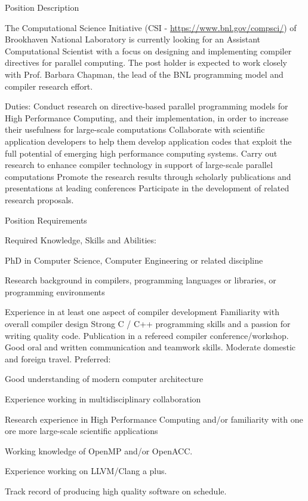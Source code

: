 \begin{frame}[label=jobApp]
{Position Description
 
The Computational Science Initiative (CSI -
\url{https://www.bnl.gov/compsci/}) of Brookhaven National Laboratory is
currently looking for an Assistant Computational Scientist with a
focus on designing and implementing compiler directives for parallel
computing. The post holder is expected to work closely with
Prof. Barbara Chapman, the lead of the BNL programming model and
compiler research effort.

Duties:
    Conduct research on directive-based parallel programming models
    for High Performance Computing, and their implementation, in order
    to increase their usefulness for large-scale computations
    Collaborate with scientific application developers to help them
    develop application codes that exploit the full potential of
    emerging high performance computing systems.
    Carry out research to enhance compiler technology in support of
    large-scale parallel computations
    Promote the research results through scholarly publications and
    presentations at leading conferences
    Participate in the development of related research proposals.

Position Requirements

Required Knowledge, Skills and Abilities:

    PhD in Computer Science, Computer Engineering or related
    discipline

    Research background in compilers, programming languages or
    libraries, or programming environments

    Experience in at least one aspect of compiler development
    Familiarity with overall compiler design
    Strong C / C++ programming skills and a passion for writing
    quality code.
    Publication in a refereed compiler conference/workshop.
    Good oral and written communication and teamwork skills.
    Moderate domestic and foreign travel. 
Preferred:

    Good understanding of modern computer architecture

    Experience working in multidisciplinary collaboration

    Research experience in High Performance Computing and/or
    familiarity with one ore more large-scale scientific applications

    Working knowledge of OpenMP and/or OpenACC.
    
    Experience working on LLVM/Clang a plus.
    
    Track record of producing high quality software on schedule.

}
\end{frame}
